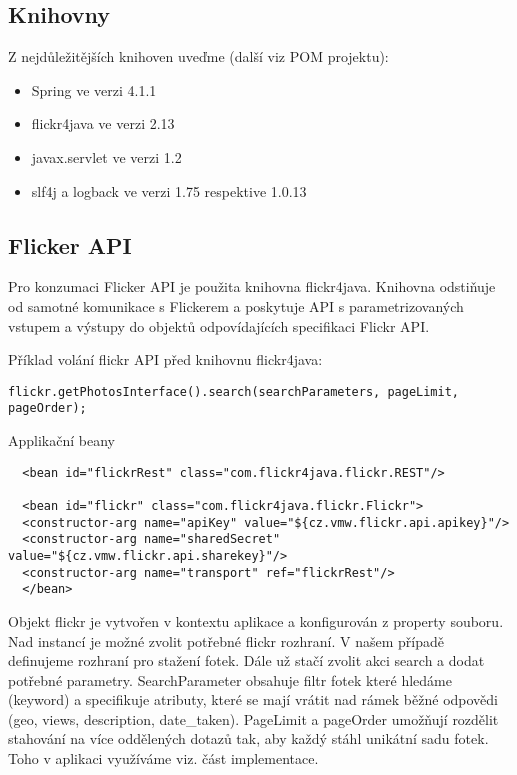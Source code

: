 \documentclass[12pt,oneside,a4paper]{article}
\begin{document}
\subsection{Knihovny}

Z nejdůležitějších knihoven uveďme (další viz POM projektu):
\begin{itemize}
	\item Spring ve verzi 4.1.1
	\item flickr4java ve verzi 2.13
	\item javax.servlet ve verzi 1.2
	\item slf4j a logback ve verzi 1.75 respektive 1.0.13
\end{itemize}

\subsection{Flicker API}

Pro konzumaci Flicker API je použita knihovna flickr4java. Knihovna odstiňuje od samotné komunikace s Flickerem a poskytuje API s parametrizovaných vstupem a výstupy do objektů odpovídajících specifikaci Flickr API. 

Příklad volání flickr API před knihovnu flickr4java:
\begin{verbatim}
flickr.getPhotosInterface().search(searchParameters, pageLimit, pageOrder);
\end{verbatim}


Applikační beany
\begin{verbatim}
  <bean id="flickrRest" class="com.flickr4java.flickr.REST"/>
  
  <bean id="flickr" class="com.flickr4java.flickr.Flickr">
  <constructor-arg name="apiKey" value="${cz.vmw.flickr.api.apikey}"/>
  <constructor-arg name="sharedSecret" value="${cz.vmw.flickr.api.sharekey}"/>
  <constructor-arg name="transport" ref="flickrRest"/>
  </bean>
\end{verbatim}  
Objekt flickr je vytvořen v kontextu aplikace a konfigurován z property souboru. Nad instancí je možné zvolit potřebné flickr rozhraní. V našem případě definujeme rozhraní pro stažení fotek. Dále už stačí zvolit akci search a dodat potřebné parametry. SearchParameter obsahuje filtr fotek které hledáme (keyword) a specifikuje atributy, které se mají vrátit nad rámek běžné odpovědi (geo, views, description, date\_taken). PageLimit a pageOrder umožňují rozdělit stahování na více oddělených dotazů tak, aby každý stáhl unikátní sadu fotek. Toho v aplikaci využíváme viz. část implementace.
 
\end{document}
